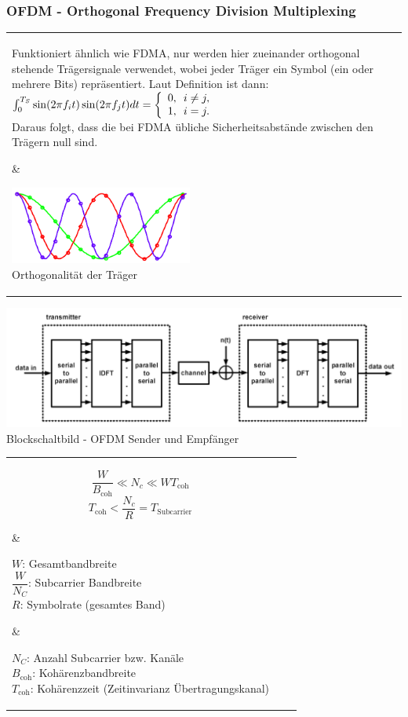 \subsubsection{OFDM - Orthogonal Frequency Division Multiplexing
}

\begin{tabular}{ll}
\parbox{12cm}{
Funktioniert ähnlich wie FDMA, nur werden hier zueinander orthogonal stehende
Trägersignale verwendet, wobei jeder Träger ein Symbol (ein oder mehrere Bits)
repräsentiert. Laut Definition ist dann: \\
$  \int_0^{T_S} \sin (2\pi f_i t)\sin (2\pi f_j t) dt = 
  \left\{\begin{array}{l@{\,\,\,\,} l}
         0 , &   i\not = j, \\ 
         1 , &   i = j .   \end{array} \right.$\\
Daraus folgt, dass die bei FDMA übliche Sicherheitsabstände zwischen den Trägern
null sind. 
       } 
&
\parbox{6cm}{
    \includegraphics[width=6cm]{./bilder/modulation_OFDM-orthogonal.png}\\
    \small Orthogonalität der Träger
}       
\end{tabular}
\begin{center}
    \includegraphics[width=15cm]{./bilder/modulation_OFDM-schematic.png}\\
    \small Blockschaltbild - OFDM Sender und Empfänger
\end{center}

\begin{tabular}{lll}
\parbox{4cm}{
$$\frac W{B_{\text{coh}}} \ll N_c \ll WT_{\text{coh}} $$ 
$$ T_{\text{coh}} < \dfrac{N_c}{R} = T_{\text{Subcarrier}} $$
       } 
&
\parbox{5cm}{
   $W$: Gesamtbandbreite \\
   $\dfrac{W}{N_C}$: Subcarrier Bandbreite \\
   $R$: Symbolrate (gesamtes Band)
}       
&
\parbox{9cm}{
   $N_C$: Anzahl Subcarrier bzw. Kanäle \\
   $B_{\text{coh}}$: Kohärenzbandbreite \\
   $T_{\text{coh}}$: Kohärenzzeit (Zeitinvarianz Übertragungskanal)
}       
\end{tabular}

